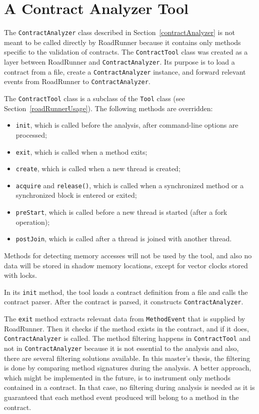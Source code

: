 \section{A Contract Analyzer Tool}
\label{contractTool}

The \texttt{ContractAnalyzer} class described in Section~\ref{contractAnalyzer}
is not meant to be called directly by RoadRunner because it contains only
methods specific to the validation of contracts. The \texttt{ContractTool} class
was created as a layer between RoadRunner and \texttt{ContractAnalyzer}. Its
purpose is to load a contract from a file, create a \texttt{ContractAnalyzer}
instance, and forward relevant events from RoadRunner to
\texttt{ContractAnalyzer}.

The \texttt{ContractTool} class is a subclass of the \texttt{Tool} class (see
Section~\ref{roadRunnerUsage}). The following methods are overridden:
\begin{itemize}
    \item \texttt{init}, which is called before the analysis, after
        command-line options are processed;
    \item \texttt{exit}, which is called when a method exits;
    \item \texttt{create}, which is called when a new thread is created;
    \item \texttt{acquire} and \texttt{release()}, which is called when a
        synchronized method or a synchronized block is entered or exited;
    \item \texttt{preStart}, which is called before a new thread is started
        (after a fork operation);
    \item \texttt{postJoin}, which is called after a thread is joined with
        another thread.
\end{itemize}

Methods for detecting memory accesses will not be used by the tool, and also no
data will be stored in shadow memory locations, except for vector clocks stored
with locks.

In its \texttt{init} method, the tool loads a contract definition from a file
and calls the contract parser. After the contract is parsed, it constructs
\texttt{ContractAnalyzer}.

The \texttt{exit} method extracts relevant data from \texttt{MethodEvent} that
is supplied by RoadRunner. Then it checks if the method exists in the contract,
and if it does, \texttt{ContractAnalyzer} is called. The method filtering
happens in \texttt{ContractTool} and not in \texttt{ContractAnalyzer} because it
is not essential to the analysis and also, there are several filtering solutions
available. In this master's thesis, the filtering is done by comparing method
signatures during the analysis. A better approach, which might be implemented in
the future, is to instrument only methods contained in a contract. In that case,
no filtering during analysis is needed as it is guaranteed that each method
event produced will belong to a method in the contract.

